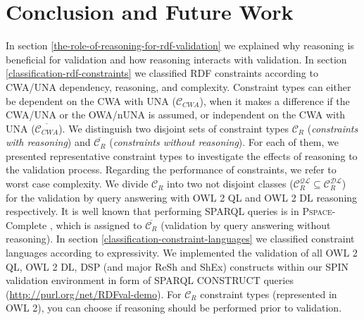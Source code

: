 \documentclass{llncs}
\newcommand{\tb}[1]{\todo[size=\small, color=green!40]{\textbf{Thomas:} #1}}
\begin{document}

%

\section{Conclusion and Future Work}

In section \ref{the-role-of-reasoning-for-rdf-validation} we explained why reasoning is beneficial for validation and how reasoning interacts with validation.
In section \ref{classification-rdf-constraints} we classified RDF constraints according to CWA/UNA dependency, reasoning, and complexity.
Constraint types can either be dependent on the CWA with UNA ($\mathcal{C}_{CWA}$), when it makes a difference if the CWA/UNA or the OWA/nUNA is assumed, or independent on the CWA with UNA ($\overline{\mathcal{C}_{CWA}}$).
We distinguish two disjoint sets of constraint types $\mathcal{C}_{R}$ ({\em constraints with reasoning}) and $\overline{\mathcal{C}_{R}}$ ({\em constraints without reasoning}).
For each of them, we presented representative constraint types to investigate the effects of reasoning to the validation process.
Regarding the performance of constraints, we refer to worst case complexity.
We divide $\mathcal{C}_R$ into two not disjoint classes ($\mathcal{C}_R ^{\mathcal{QL}} \subseteq \mathcal{C}_R ^{\mathcal{DL}}$) for the validation by query answering with OWL 2 QL and OWL 2 DL reasoning respectively.
It is well known that performing SPARQL queries is in \textsc{Pspace}-Complete \cite{Perez2009}, 
which is assigned to $\overline{\mathcal{C}_R}$ (validation by query answering without reasoning).
In section \ref{classification-constraint-languages} we classified constraint languages according to expressivity. 
\tb{needs to be described more}
We implemented the validation of all OWL 2 QL, OWL 2 DL, DSP (and major ReSh and ShEx) constructs
within our SPIN validation environment in form of SPARQL CONSTRUCT queries (\url{http://purl.org/net/RDFval-demo}).
For $\mathcal{C}_{R}$ constraint types (represented in OWL 2), you can choose if reasoning should be performed prior to validation.
\end{document}
